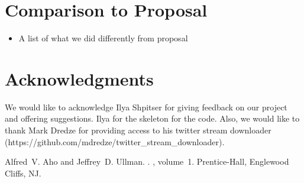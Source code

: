 \documentclass[11pt,letterpaper]{article}
\begin{document}
\section{Comparison to Proposal}

\begin{itemize}
\item A list of what we did differently from proposal
\end{itemize}

\section*{Acknowledgments}
We would like to acknowledge Ilya Shpitser for giving feedback on our project and offering suggestions. Ilya for the skeleton for the code.
Also, we would like to thank Mark Dredze for providing access to his twitter stream downloader (https://github.com/mdredze/twitter_stream_downloader).

\begin{thebibliography}{}

Alfred~V. Aho and Jeffrey~D. Ullman.
.
, volume~1.
\newblock Prentice-{Hall}, Englewood Cliffs, NJ.

\end{thebibliography}
\end{document}
